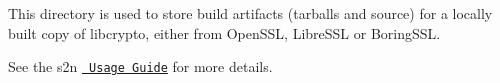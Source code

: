 This directory is used to store build artifacts (tarballs and source) for a locally built copy of libcrypto, either from Open\+SSL, Libre\+SSL or Boring\+SSL.

See the s2n \href{https://github.com/awslabs/s2n/blob/main/docs/USAGE-GUIDE.md}{\texttt{ Usage Guide}} for more details. 